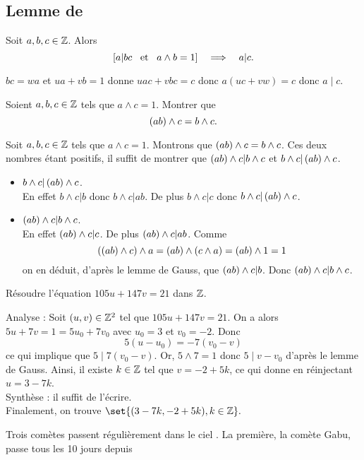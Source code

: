 \documentclass{magnolia}
\begin{document}
\subsection{Lemme de }

\begin{theoreme}
Soit $a,b,c\in\mathbb{Z}$. Alors
\[\left[a|bc \quad\!\text{et}\quad\! a\wedge b=1\right] \quad\Longrightarrow\quad a|c.\]  
\end{theoreme}

\begin{preuve}
$bc=wa$ et $ua+vb=1$ donne $uac+vbc=c$ donc $a(uc+vw)=c$ donc $a\mid c$.
\end{preuve} 

\begin{exos}
\exo Soient $a,b,c\in\mathbb{Z}$ tels que $a\wedge c=1$. Montrer que
  \[\left(ab\right)\wedge c=b\wedge c.\]
  \begin{sol}
  Soit $a,b,c\in\mathbb{Z}$ tels que $a\wedge c=1$. Montrons que
  $\left(ab\right)\wedge c=b\wedge c$. Ces deux nombres étant positifs, il suffit de
  montrer que $\left(ab\right)\wedge c|b\wedge c$ et $b\wedge c|\left(ab\right)\wedge c$.
  \begin{itemize}
  \item $b\wedge c|\left(ab\right)\wedge c$.\\
    En effet $b\wedge c|b$ donc $b\wedge c|ab$. De plus $b\wedge c|c$ donc
    $b\wedge c|\left(ab\right)\wedge c$.
  \item $\left(ab\right)\wedge c|b\wedge c$.\\
    En effet $\left(ab\right)\wedge c|c$. De plus $\left(ab\right)\wedge c|ab$. Comme
    \[\left(\left(ab\right)\wedge c\right)\wedge a=\left(ab\right)\wedge\left(c\wedge a\right)=\left(ab\right)\wedge 1=1\]
    on en déduit, d'après le lemme de Gauss, que $\left(ab\right)\wedge c|b$. Donc
    $\left(ab\right)\wedge c|b\wedge c$.
  \end{itemize}
  \end{sol}
\exo Résoudre l'équation $105u+147v=21$ dans $\mathbb{Z}$.
  \begin{sol}
  Analyse : Soit $(u,v) \in \mathbb{Z}^2$ tel que $105u+147v=21$. On a alors $5u+7v=1=5u_0+7v_0$ avec $u_0=3$ et $v_0=-2$. Donc $$5(u-u_0)=-7(v_0-v)$$ ce qui implique que $5\mid 7(v_0-v)$. Or, $5\wedge 7=1$ donc $5\mid v-v_0$ d'après le lemme de Gauss. Ainsi, il existe $k\in \mathbb{Z}$ tel que $v=-2+5k$, ce qui donne en réinjectant $u=3-7k$.\\
  Synthèse : il suffit de l'écrire.\\
  Finalement, on trouve $\set{(3-7k,-2+5k), k\in\Z}.$
  \end{sol}
\exo Trois comètes passent régulièrement dans le ciel . La
  première, la comète Gabu, passe tous les 10 jours depuis

\end{exos}
\end{document}
